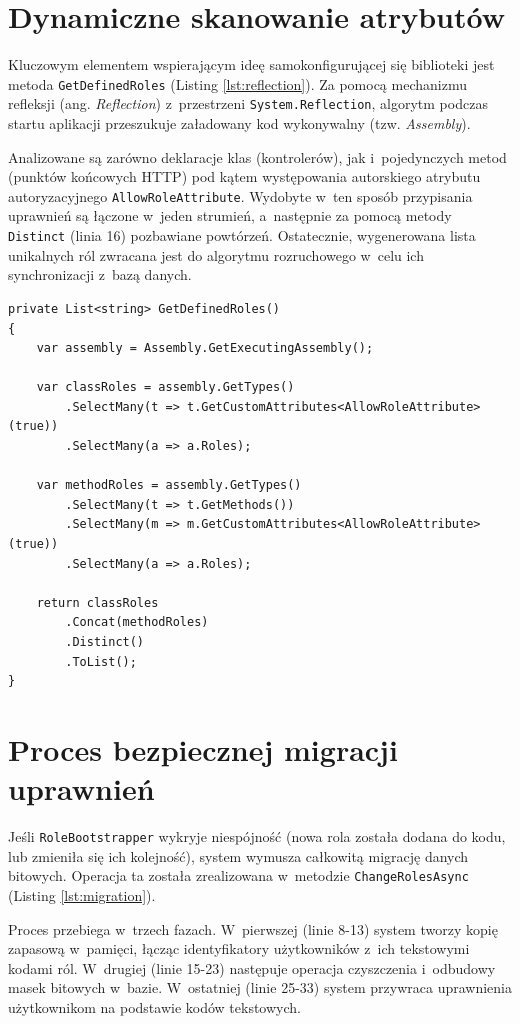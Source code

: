 \documentclass{SGGW-thesis}
\begin{document}
\section{Dynamiczne skanowanie atrybutów}

Kluczowym elementem wspierającym ideę samokonfigurującej się biblioteki jest metoda \texttt{GetDefinedRoles} (Listing \ref{lst:reflection}). Za pomocą mechanizmu refleksji (ang. \textit{Reflection}) z~przestrzeni \texttt{System.Reflection}, algorytm podczas startu aplikacji przeszukuje załadowany kod wykonywalny (tzw. \textit{Assembly}). 

Analizowane są zarówno deklaracje klas (kontrolerów), jak i~pojedynczych metod (punktów końcowych HTTP) pod kątem występowania autorskiego atrybutu autoryzacyjnego \texttt{AllowRoleAttribute}. Wydobyte w~ten sposób przypisania uprawnień są łączone w~jeden strumień, a~następnie za pomocą metody \texttt{Distinct} (linia 16) pozbawiane powtórzeń. Ostatecznie, wygenerowana lista unikalnych ról zwracana jest do algorytmu rozruchowego w~celu ich synchronizacji z~bazą danych.

\begin{lstlisting}[caption={Mechanizm refleksji skanujący assembly w poszukiwaniu ról}, label={lst:reflection}]    
private List<string> GetDefinedRoles()
{
    var assembly = Assembly.GetExecutingAssembly();

    var classRoles = assembly.GetTypes()
        .SelectMany(t => t.GetCustomAttributes<AllowRoleAttribute>(true))
        .SelectMany(a => a.Roles);

    var methodRoles = assembly.GetTypes()
        .SelectMany(t => t.GetMethods())
        .SelectMany(m => m.GetCustomAttributes<AllowRoleAttribute>(true))
        .SelectMany(a => a.Roles);

    return classRoles
        .Concat(methodRoles)
        .Distinct()
        .ToList();
}
\end{lstlisting}
\section{Proces bezpiecznej migracji uprawnień}

Jeśli \texttt{RoleBootstrapper} wykryje niespójność (nowa rola została dodana do kodu, lub zmieniła się ich kolejność), system wymusza całkowitą migrację danych bitowych. Operacja ta została zrealizowana w~metodzie \texttt{ChangeRolesAsync} (Listing \ref{lst:migration}). 

Proces przebiega w~trzech fazach. W~pierwszej (linie 8-13) system tworzy kopię zapasową w~pamięci, łącząc identyfikatory użytkowników z~ich tekstowymi kodami ról. W~drugiej (linie 15-23) następuje operacja czyszczenia i~odbudowy masek bitowych w~bazie. W~ostatniej (linie 25-33) system przywraca uprawnienia użytkownikom na podstawie kodów tekstowych.
\end{document}
